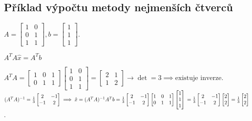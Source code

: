 \subsection{Příklad výpočtu metody nejmenších čtverců}
$
A=
\begin{bmatrix}
    1 & 0 \\
    0 & 1 \\
    1 & 1
\end{bmatrix},
b=
\begin{bmatrix}
    1 \\
    1 \\
    1 
\end{bmatrix}$.

$A^T A \hat x = A^T b$

$A^T A = 
\begin{bmatrix}
    1 & 0 & 1 \\
    0 & 1 & 1
\end{bmatrix}
\begin{bmatrix}
    1 & 0 \\
    0 & 1 \\
    1 & 1
\end{bmatrix}
=
\begin{bmatrix}
    2 & 1 \\
    1 & 2 
\end{bmatrix} 
\rightarrow \det = 3 \implies \text{existuje inverze.}$
\\

$(A^T A)^{-1} = \frac{1}{3}
\begin{bmatrix}
    2 & -1 \\
    -1 & 2 
\end{bmatrix} \implies \hat x = (A^T A)^{-1}A^T b = \frac{1}{3}
\begin{bmatrix}
    2 & -1 \\
    -1 & 2 
\end{bmatrix}
\begin{bmatrix}
    1 & 0 & 1 \\
    0 & 1 & 1
\end{bmatrix}
\begin{bmatrix}
    1 \\
    1 \\
    1 
\end{bmatrix}\\ 
= \frac{1}{3}
\begin{bmatrix}
    2 & -1 \\
    -1 & 2 
\end{bmatrix}
\begin{bmatrix}
    2 \\
    2 
\end{bmatrix} = \frac{1}{3}
\begin{bmatrix}
    2 \\
    2 
\end{bmatrix}$.

